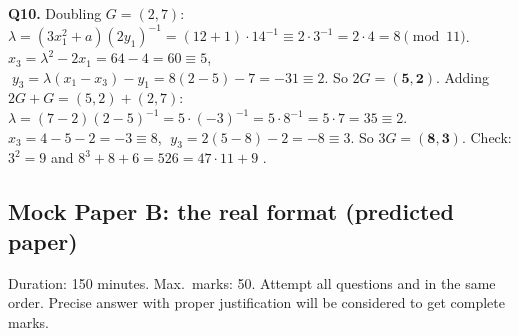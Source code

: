 \textbf{Q10.} Doubling $G = (2, 7)$: $\lambda = (3x_1^2 + a)(2y_1)^{-1} = (12 + 1) \cdot 14^{-1} \equiv 2 \cdot 3^{-1} = 2 \cdot 4 = 8 \pmod{11}$.
$x_3 = \lambda^2 - 2x_1 = 64 - 4 = 60 \equiv 5$, $\;y_3 = \lambda(x_1 - x_3) - y_1 = 8(2 - 5) - 7 = -31 \equiv 2$. So $2G = \mathbf{(5, 2)}$.
Adding $2G + G = (5, 2) + (2, 7)$: $\lambda = (7 - 2)(2 - 5)^{-1} = 5 \cdot (-3)^{-1} = 5 \cdot 8^{-1} = 5 \cdot 7 = 35 \equiv 2$.
$x_3 = 4 - 5 - 2 = -3 \equiv 8$, $\;y_3 = 2(5 - 8) - 2 = -8 \equiv 3$. So $3G = \mathbf{(8, 3)}$.
Check: $3^2 = 9$ and $8^3 + 8 + 6 = 526 = 47 \cdot 11 + 9$ \checkmark.

\clearpage
\subsection{Mock Paper B: the real format (predicted paper)}

\begin{keybox}[title=Instructions]
Duration: 150 minutes. Max.\ marks: 50. Attempt all questions and in the same order. Precise answer with proper justification will be considered to get complete marks.
\end{keybox}

